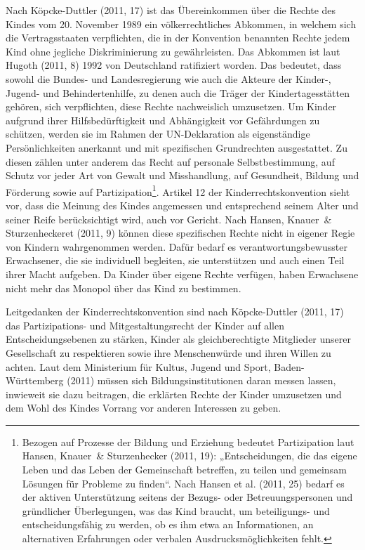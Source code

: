 Nach Köpcke-Duttler (2011, 17) ist das Übereinkommen über die Rechte des Kindes vom 20. November 1989 ein völkerrechtliches Abkommen, in welchem sich die Vertragsstaaten verpflichten, die in der Konvention benannten Rechte jedem Kind ohne jegliche Diskriminierung zu gewährleisten. Das Abkommen ist laut Hugoth (2011, 8) 1992 von Deutschland ratifiziert worden. Das bedeutet, dass sowohl die Bundes- und Landesregierung wie auch die Akteure der Kinder-, Jugend- und Behindertenhilfe, zu denen auch die Träger der Kindertagesstätten gehören, sich verpflichten, diese Rechte nachweislich umzusetzen. Um Kinder aufgrund ihrer Hilfsbedürftigkeit und Abhängigkeit vor Gefährdungen zu schützen, werden sie im Rahmen der UN-Deklaration als eigenständige Persönlichkeiten anerkannt und mit spezifischen Grundrechten ausgestattet. Zu diesen zählen unter anderem das Recht auf personale Selbstbestimmung, auf Schutz vor jeder Art von Gewalt und Miss\-handlung, auf Gesundheit, Bildung und Förderung sowie auf Partizipation\footnote{Bezogen auf Prozesse der Bildung und Erziehung bedeutet Partizipation laut Hansen, Knauer~\& Sturzenhecker (2011, 19): „Entscheidungen, die das eigene Leben und das Leben der Gemeinschaft betreffen, zu teilen und gemeinsam Lösungen für Probleme zu finden“. Nach Hansen et al. (2011, 25) bedarf es der aktiven Unterstützung seitens der Bezugs- oder Betreuungspersonen und gründlicher  Überlegungen, was das Kind braucht, um beteiligungs- und entscheidungsfähig zu werden, ob es ihm etwa an Informationen, an alternativen Erfahrungen oder verbalen Ausdrucksmöglichkeiten fehlt.}. 
Artikel 12 der Kinderrechtskonvention sieht vor, dass die Meinung des Kindes angemessen und entsprechend seinem Alter und seiner Reife berücksichtigt wird, auch vor Gericht. Nach Hansen, Knauer~\& Sturzenheckeret (2011, 9) können diese spezifischen Rechte nicht in eigener Regie von Kindern wahrgenommen werden. Dafür bedarf es verantwortungsbewusster Erwachsener, die sie individuell begleiten, sie unterstützen und auch einen Teil ihrer Macht aufgeben. Da Kinder über eigene Rechte verfügen, haben Erwachsene nicht mehr das Monopol über das Kind zu bestimmen. 

Leitgedanken der Kinderrechtskonvention sind nach Köpcke-Duttler (2011, 17) das Partizipations- und Mitgestaltungsrecht der Kinder auf allen Entscheidungsebenen zu stärken, Kinder als gleichberechtigte Mitglieder unserer Gesellschaft zu respektieren sowie ihre Menschenwürde und ihren Willen zu achten. Laut dem Ministerium für Kultus, Jugend und Sport, Baden-Württemberg (2011) müssen sich Bildungsinstitutionen daran messen lassen, inwieweit sie dazu beitragen, die erklärten Rechte der Kinder umzusetzen und dem Wohl des Kindes Vorrang vor anderen Interessen zu geben.

